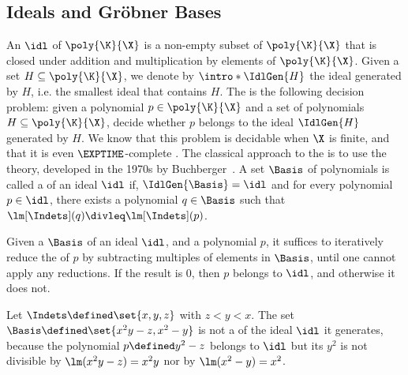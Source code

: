 \subsection{Ideals and Gr\"{o}bner Bases}
\AP An  $\idl$ of
$\poly{\K}{\X}$ is a non-empty subset of $\poly{\K}{\X}$ that is closed under
addition and multiplication by elements of $\poly{\K}{\X}$. Given a set $H
\subseteq \poly{\K}{\X}$, we denote by $\intro*\IdlGen{H}$ the ideal generated
by $H$, i.e. the smallest ideal that contains $H$. The  is the following decision problem: given a polynomial $p \in
\poly{\K}{\X}$ and a set of polynomials $H \subseteq \poly{\K}{\X}$, decide
whether $p$ belongs to the ideal $\IdlGen{H}$ generated by $H$. We know that
this problem is decidable when $\X$ is finite, and that it is even
$\EXPTIME$-complete \cite{MAME82}. The classical approach to the  is to use the  theory, developed
in the 1970s by Buchberger~\cite{BUCH76}. 
A set $\Basis$ of polynomials is called a  of
an ideal $\idl$ if, $\IdlGen{\Basis} = \idl$ and for every polynomial $p \in
\idl$, there exists a polynomial $q \in \Basis$ such that $\lm[\Indets](q)
\divleq \lm[\Indets](p)$.

Given a  $\Basis$ of an ideal $\idl$, and a polynomial $p$,
it suffices to iteratively reduce the  of $p$ by
subtracting multiples of elements in $\Basis$, until one cannot apply any
reductions. If the result is $0$, then $p$ belongs to $\idl$, and otherwise it
does not. 

\begin{example}
  Let $\Indets \defined \set{x,y,z}$ with $z < y < x$. The
  set $\Basis \defined \set{x^2y - z, x^2 - y}$ is not 
  a  of the ideal $\idl$ it generates,
  because the polynomial $p \defined y^2 - z$ belongs to $\idl$
  but its  $y^2$ is not divisible by 
  $\lm(x^2y - z) = x^2y$ nor by $\lm(x^2 - y) = x^2$.
\end{example}


